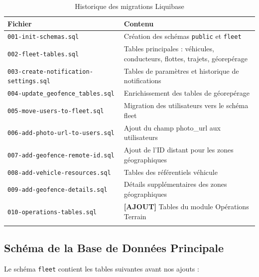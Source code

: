 \documentclass[12pt,a4paper]{report}
\begin{document}
\begin{longtable}{p{4cm}p{9cm}}
\toprule
\textbf{Fichier} & \textbf{Contenu} \\
\midrule
\endhead
\texttt{001-init-schemas.sql} & Création des schémas \texttt{public} et \texttt{fleet} \\
\texttt{002-fleet-tables.sql} & Tables principales : véhicules, conducteurs, flottes, trajets, géorepérage \\
\texttt{003-create-notification-settings.sql} & Tables de paramètres et historique de notifications \\
\texttt{004-update\_geofence\_tables.sql} & Enrichissement des tables de géorepérage \\
\texttt{005-move-users-to-fleet.sql} & Migration des utilisateurs vers le schéma fleet \\
\texttt{006-add-photo-url-to-users.sql} & Ajout du champ photo\_url aux utilisateurs \\
\texttt{007-add-geofence-remote-id.sql} & Ajout de l'ID distant pour les zones géographiques \\
\texttt{008-add-vehicle-resources.sql} & Tables des référentiels véhicule \\
\texttt{009-add-geofence-details.sql} & Détails supplémentaires des zones géographiques \\
\texttt{010-operations-tables.sql} & \textbf{[AJOUT]} Tables du module Opérations Terrain \\
\bottomrule
\caption{Historique des migrations Liquibase}
\end{longtable}

\subsection{Schéma de la Base de Données Principale}

Le schéma \texttt{fleet} contient les tables suivantes avant nos ajouts :
\end{document}
